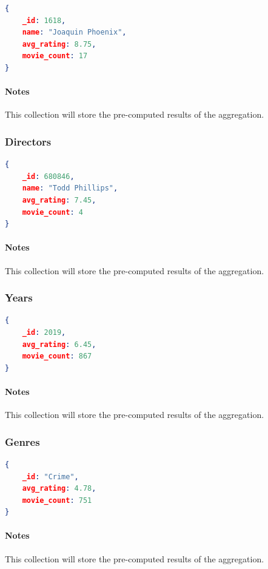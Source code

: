 \documentclass[11pt]{article}
\begin{document}
\begin{lstlisting}[language=json]	
{
	_id: 1618,
	name: "Joaquin Phoenix",
	avg_rating: 8.75,
	movie_count: 17
}
\end{lstlisting}

\paragraph{Notes}
This collection will store the pre-computed results of the aggregation.

\subsubsection{Directors}
\label{sec:directors}

\begin{lstlisting}[language=json]	
{
	_id: 680846,
	name: "Todd Phillips",
	avg_rating: 7.45,
	movie_count: 4	
}
\end{lstlisting}

\paragraph{Notes}
This collection will store the pre-computed results of the aggregation.

\subsubsection{Years}
\label{sec:years}

\begin{lstlisting}[language=json]	
{
	_id: 2019,
	avg_rating: 6.45,
	movie_count: 867
}
\end{lstlisting}

\paragraph{Notes}
This collection will store the pre-computed results of the aggregation.

\subsubsection{Genres}
\label{sec:genres}

\begin{lstlisting}[language=json]	
{
	_id: "Crime",
	avg_rating: 4.78,
	movie_count: 751
}
\end{lstlisting}

\paragraph{Notes}
This collection will store the pre-computed results of the aggregation.
\end{document}

